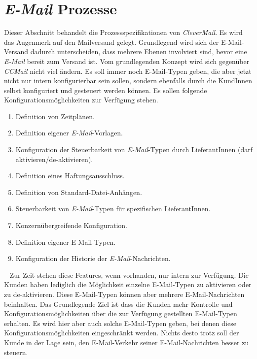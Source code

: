 \section{\emph{E-Mail} Prozesse}
\label{sec:clevermail-prozesse}
Dieser Abschnitt behandelt die Prozessspezifikationen von \emph{CleverMail}. Es wird das Augenmerk auf den Mailversand gelegt. Grundlegend wird sich der E-Mail-Versand dadurch unterscheiden, dass mehrere Ebenen involviert sind, bevor eine \emph{E-Mail} bereit zum Versand ist. 
\newline
\newline
Vom grundlegenden Konzept wird sich gegenüber \emph{CCMail} nicht viel ändern. Es soll immer noch E-Mail-Typen geben, die aber jetzt nicht nur intern konfigurierbar sein sollen,  sondern ebenfalls durch die KundInnen selbst konfiguriert und gesteuert werden können. Es sollen folgende Konfigurationsmöglichkeiten zur Verfügung stehen.
\begin{enumerate}
	\item Definition von Zeitplänen.
	\item Definition eigener \emph{E-Mail}-Vorlagen.
	\item Konfiguration der Steuerbarkeit von \emph{E-Mail}-Typen durch LieferantInnen (darf aktivieren/de-aktivieren).
	\item Definition eines Haftungsausschluss. 
	\item Definition von Standard-Datei-Anhängen.
	\item Steuerbarkeit von \emph{E-Mail}-Typen für spezifischen LieferantInnen.
	\item Konzernübergreifende Konfiguration.
	\item Definition eigener E-Mail-Typen.
	\item Konfiguration der Historie der \emph{E-Mail}-Nachrichten.
\end{enumerate}
\ \newline
Zur Zeit stehen diese Features, wenn vorhanden, nur intern zur Verfügung. Die Kunden haben lediglich die Möglichkeit einzelne E-Mail-Typen zu aktivieren oder zu de-aktivieren. Diese E-Mail-Typen können aber mehrere E-Mail-Nachrichten beinhalten. Das Grundlegende Ziel ist dass die Kunden mehr Kontrolle und Konfigurationsmöglichkeiten über die zur Verfügung gestellten E-Mail-Typen erhalten. Es wird hier aber auch solche E-Mail-Typen geben, bei denen diese Konfigurationsmöglichkeiten eingeschränkt werden. Nichts desto trotz soll der Kunde in der Lage sein, den E-Mail-Verkehr seiner E-Mail-Nachrichten besser zu steuern.

